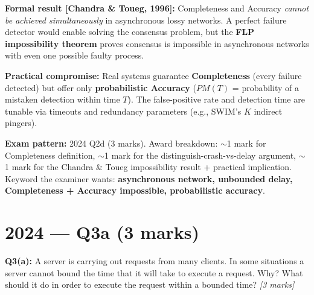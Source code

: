 \documentclass[12pt,a4paper]{article}
\begin{document}
\begin{solbox}
\textbf{Formal result [Chandra \& Toueg, 1996]:}
Completeness and Accuracy \emph{cannot be achieved simultaneously} in asynchronous
lossy networks. A perfect failure detector would enable solving the consensus problem,
but the \textbf{FLP impossibility theorem} proves consensus is impossible in asynchronous
networks with even one possible faulty process.

\medskip
\textbf{Practical compromise:}
Real systems guarantee \textbf{Completeness} (every failure detected) but offer only
\textbf{probabilistic Accuracy} ($PM(T)$ = probability of a mistaken detection within
time $T$). The false-positive rate and detection time are tunable via timeouts and
redundancy parameters (e.g., SWIM's $K$ indirect pingers).
\end{solbox}

\begin{notesbox}
\textbf{Exam pattern:} 2024 Q2d (3 marks).
Award breakdown: $\sim$1 mark for Completeness definition, $\sim$1 mark for the
distinguish-crash-vs-delay argument, $\sim$1 mark for the Chandra \& Toueg impossibility
result + practical implication.
Keyword the examiner wants: \textbf{asynchronous network, unbounded delay,
Completeness + Accuracy impossible, probabilistic accuracy}.
\end{notesbox}

\newpage
\section{2024 — Q3a (3 marks)}

\begin{qbox}
\textbf{Q3(a):} A server is carrying out requests from many clients. In some situations
a server cannot bound the time that it will take to execute a request. Why? What should
it do in order to execute the request within a bounded time?
\hfill \textit{[3 marks]}
\end{qbox}
\end{document}
